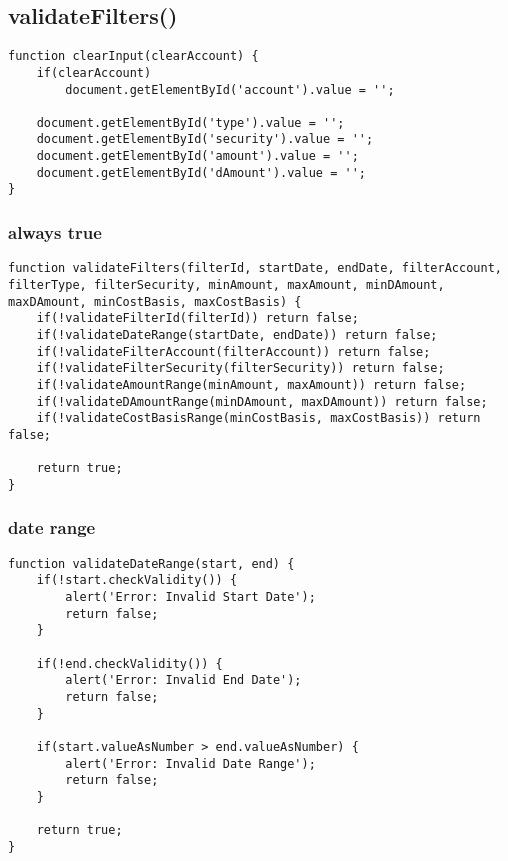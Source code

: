 \documentclass[letterpaper]{article}
\begin{document}
\subsection{validateFilters()}

\begin{lstlisting}[firstnumber=384]
function clearInput(clearAccount) {
    if(clearAccount)
        document.getElementById('account').value = '';

    document.getElementById('type').value = '';
    document.getElementById('security').value = '';
    document.getElementById('amount').value = '';
    document.getElementById('dAmount').value = '';
}
\end{lstlisting}

\subsubsection{always true}

\begin{lstlisting}[firstnumber=394]
function validateFilters(filterId, startDate, endDate, filterAccount, filterType, filterSecurity, minAmount, maxAmount, minDAmount, maxDAmount, minCostBasis, maxCostBasis) {
    if(!validateFilterId(filterId)) return false;
    if(!validateDateRange(startDate, endDate)) return false;
    if(!validateFilterAccount(filterAccount)) return false;
    if(!validateFilterSecurity(filterSecurity)) return false;
    if(!validateAmountRange(minAmount, maxAmount)) return false;
    if(!validateDAmountRange(minDAmount, maxDAmount)) return false;
    if(!validateCostBasisRange(minCostBasis, maxCostBasis)) return false;

    return true;
}
\end{lstlisting}

\subsubsection{date range}

\begin{lstlisting}[firstnumber=410]
function validateDateRange(start, end) {
    if(!start.checkValidity()) {
        alert('Error: Invalid Start Date');
        return false;
    }

    if(!end.checkValidity()) {
        alert('Error: Invalid End Date');
        return false;
    }

    if(start.valueAsNumber > end.valueAsNumber) {
        alert('Error: Invalid Date Range');
        return false;
    }

    return true;
}
\end{lstlisting}
\end{document}
